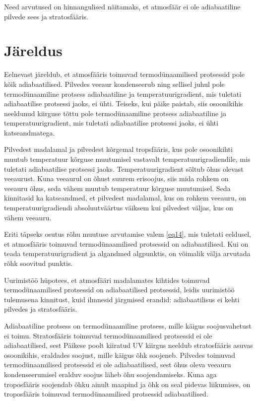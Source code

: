 \documentclass{trkut}%
\begin{document}
Need arvutused on hinnangulised näitamaks, et atmosfäär ei ole adiabaatiline pilvede sees ja stratosfääris.


\section{Järeldus}
Eelnevast järeldub, et atmosfääris toimuvad termodünaamilised protsessid pole kõik adiabaatilised. Pilvedes veeaur kondenseerub ning sellisel juhul pole termodünaamiline protsess adiabaatiline ja temperatuurigradient, mis tuletati adiabaatilise protsessi jaoks, ei ühti. Teiseks, kui päike paistab, siis osoonikihis neeldunud kiirguse tõttu pole termodünaamiline protsess adiabaatiline ja temperatuurigradient, mis tuletati adiabaatilise protsessi jaoks, ei ühti katseandmatega.

Pilvedest madalamal ja pilvedest kõrgemal tropsfääris, kus pole osoonikihti muutub temperatuur kõrguse muutumisel vastavalt temperatuurigradiendile, mis tuletati adiabaatilise protsessi jaoks. Temperatuurigradient sõltub õhus olevast veeaurust. Kuna veeaurul on õhust suurem erisoojus, siis mida rohkem on veeauru õhus, seda vähem muutub temperatuur kõrguse muutumisel. Seda kinnitasid ka katseandmed, et pilvedest madalamal, kus on rohkem veeauru, on temperatuurigradiendi absoluutväärtus väiksem kui pilvedest väljas, kus on vähem veeauru.

Eriti täpseks osutus rõhu muutuse arvutamise valem \ref{eq14}, mis tuletati eeldusel, et atmosfääris toimuvad termodünaamilised protsessid on adiabaatilised. Kui on teada temperatuurigradient ja algandmed algpunktis, on võimalik välja arvutada rõhk soovitud punktis.


Uurimistöö hüpotees, et atmosfääri madalamates kihtides toimuvad termodünaamilised protsessid on adiabaatilised protsessid, leidis uurimistöö tulemusena kinnitust, kuid ilmnesid järgmised erandid: adiabaatilisus ei kehti pilvedes ja stratosfääris. 

Adiabaatiline protsess on termodünaamiline protsess, mille käigus soojusvahetust ei toimu. Stratosfääris toimuvad termodünaamilised protsessid ei ole adiabaatilised, sest Päikese poolt kiiratud UV kiirgus neeldub stratosfääris asuvas osoonikihis, eraldades soojust, mille käigus õhk soojeneb. Pilvedes toimuvad termodünaamilised protsessid ei ole adiabaatilised, sest õhus oleva veeauru kondenseerumisel eralduv soojus läheb õhu soojendamiseks. Kuna aga troposfääris soojendab õhku ainult maapind ja õhk on seal pidevas liikumises, on troposfääris toimuvad termodünaamilised protsessid adiabaatilised.
\end{document}
